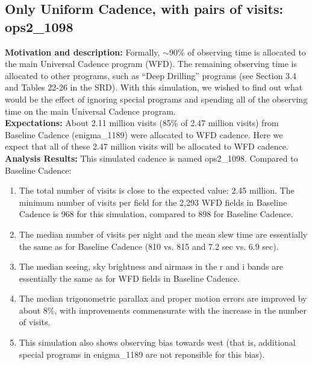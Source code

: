 \documentclass[manuscript]{article}
\begin{document}
\subsection{Only Uniform Cadence, with pairs of visits: ops2\_1098} 

{\bf Motivation and description:} Formally, $\sim$90\% of observing time is allocated 
to the main Universal Cadence program (WFD). The remaining observing time is allocated to other 
programs, such as ``Deep Drilling'' programs (see Section 3.4 and Tables 22-26  in the SRD).
With this simulation, we wished to find out what would be the effect 
of ignoring special programs and spending all of the observing time on the main 
Universal Cadence program. \\

{\bf Expectations:} About 2.11 million visits (85\% of 2.47 million visits)
from Baseline Cadence (enigma\_1189) were allocated to WFD cadence. Here we expect 
that all of these 2.47 million visits will be allocated to WFD cadence. \\

{\bf Analysis Results:} This simulated cadence is named ops2\_1098. Compared
to Baseline Cadence: 
\begin{enumerate}
\item The total number of visits is close to the expected value: 2.45 million. 
The minimum number of visits per field for the 2,293 WFD fields in Baseline Cadence
is 968 for this simulation, compared to 898 for Baseline Cadence. 
\item The median number of visits per night and the mean slew time are 
essentially the same as for Baseline Cadence (810 vs. 815 and 7.2 sec vs. 6.9 sec). 
\item The median seeing, sky brightness and airmass in the r and i bands are 
      essentially the same as for WFD fields in Baseline Cadence. 
\item The median trigonometric parallax and proper motion errors are improved by
about 8\%, with improvements commensurate with the increase in the number of visits. 
\item This simulation also shows observing bias towards west (that is, additional
special programs in enigma\_1189 are not reponsible for this bias). 
\end{enumerate}
\end{document}
